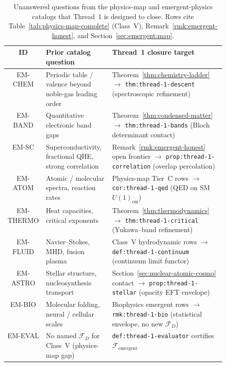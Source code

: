 \begin{table}[ht]
\centering
\small
\renewcommand{\arraystretch}{1.10}
\begin{tabular}{@{}clp{0.52\linewidth}@{}}
\toprule
\textbf{ID} & \textbf{Prior catalog question} & \textbf{Thread~1 closure target} \\
\midrule
EM-CHEM &
  Periodic table / valence beyond noble-gas leading order &
  Theorem~\ref{thm:chemistry-ladder} $\to$
  \texttt{thm:thread-1-descent} (spectroscopic refinement) \\
EM-BAND &
  Quantitative electronic band gaps &
  Theorem~\ref{thm:condensed-matter} $\to$
  \texttt{thm:thread-1-bands} (Bloch determinant contact) \\
EM-SC &
  Superconductivity, fractional QHE, strong correlation &
  Remark~\ref{rmk:emergent-honest} open frontier $\to$
  \texttt{prop:thread-1-correlation} (overlap percolation) \\
EM-ATOM &
  Atomic / molecular spectra, reaction rates &
  Physics-map Tier~C rows $\to$
  \texttt{cor:thread-1-qed} (QED on SM $U(1)_{\mathrm{em}}$) \\
EM-THERMO &
  Heat capacities, critical exponents &
  Theorem~\ref{thm:thermodynamics} $\to$
  \texttt{thm:thread-1-critical} (Yukawa--band refinement) \\
EM-FLUID &
  Navier--Stokes, MHD, fusion plasma &
  Class~V hydrodynamic rows $\to$
  \texttt{def:thread-1-continuum} (continuum limit functor) \\
EM-ASTRO &
  Stellar structure, nucleosynthesis transport &
  Section~\ref{sec:nuclear-atomic-cosmo} contact $\to$
  \texttt{prop:thread-1-stellar} (opacity EFT envelope) \\
EM-BIO &
  Molecular folding, neural / cellular scales &
  Biophysics emergent rows $\to$
  \texttt{rmk:thread-1-bio} (statistical envelope, no new $\mathcal{F}_D$) \\
EM-EVAL &
  No named $\mathcal{F}_D$ for Class~V (physics-map gap) &
  \texttt{def:thread-1-evaluator} certifies
  $\mathcal{F}_{\mathrm{emergent}}$ \\
\bottomrule
\end{tabular}
\caption{Unanswered questions from the physics-map and emergent-physics catalogs
that Thread~1 is designed to close. Rows cite
Table~\ref{tab:physics-map-complete} (Class~V), Remark~\ref{rmk:emergent-honest},
and Section~\ref{sec:emergent:map}.}
\label{tab:thread-1-questions}
\end{table}

